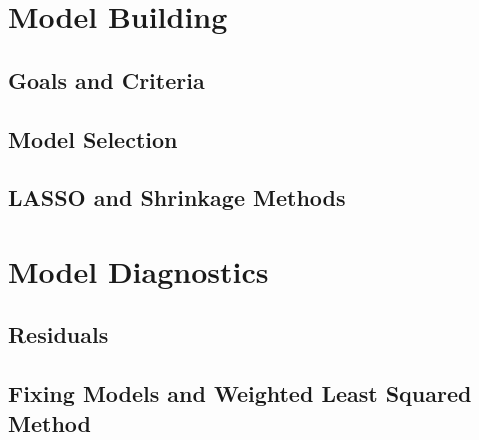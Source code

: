 \documentclass[11pt,fleqn]{book} %
\begin{document}
\chapter{Model Building}


\section{Goals and Criteria}


\section{Model Selection}


\section{LASSO and Shrinkage Methods}



\chapter{Model Diagnostics}


\section{Residuals}


\section{Fixing Models and Weighted Least Squared Method}
\end{document}
